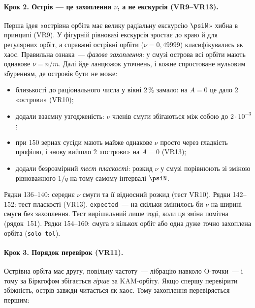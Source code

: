 \paragraph{Крок 2. Острів --- це захоплення $\nu$, а не екскурсія (VR9--VR13).} Перша ідея
«острівна орбіта має велику радіальну екскурсію $\psiN$» хибна в принципі (VR9). У фігурній
рівновазі екскурсія зростає до краю й для регулярних орбіт, а справжні острівні орбіти
($\nu=0{,}49999$) класифікувались як хаос. Правильна ознака~--- \emph{фазове захоплення}: у
смузі острова всі орбіти мають однакове $\nu=n/m$. Далі йде ланцюжок уточнень, і кожне
спростоване нульовим збуренням, де островів бути не може:
\begin{itemize}
  \item близькості до раціонального числа у вікні 2\,\% замало: на $A=0$ це дало 2 «острови» (VR10);
  \item додали взаємну узгодженість: $\nu$ членів смуги збігаються між собою до $2\cdot10^{-3}$;
  \item при 150 зернах сусіди мають майже однакове $\nu$ просто через гладкість профілю,
        і знову вийшло 2 «острови» на $A=0$ (VR13);
  \item додали безрозмірний \emph{тест пласкості}: розкид $\nu$ у смузі порівнюють зі
        зміною рівноважного $1/q$ на тому самому інтервалі $\psiN$.
\end{itemize}


Рядки 136--140: середнє $\nu$ смуги та її відносний розкид (тест VR10). Рядки 142--152: тест
пласкості (VR13). \texttt{expected}~--- на скільки змінилось би $\nu$ на ширині смуги без
захоплення. Тест вирішальний лише тоді, коли ця зміна помітна (рядок~151). Рядки 154--160:
смуга з кількох орбіт або одна дуже точно захоплена орбіта (\texttt{solo\_tol}).

\paragraph{Крок 3. Порядок перевірок (VR11).} Острівна орбіта має другу, повільну частоту~---
лібрацію навколо O-точки~--- і тому за Біркгофом збігається \emph{гірше} за KAM-орбіту. Якщо
спершу перевірити збіжність, острів завжди читається як хаос. Тому захоплення перевіряється
першим:


